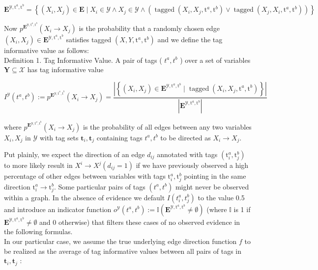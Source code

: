 \documentclass[10pt]{article}
\begin{document}
\begin{equation*}
\mathbf{E}^{\mathcal{Y}, \mathrm{t}^{a}, \mathrm{t}^{b}}=\left\{\left(X_{i}, X_{j}\right) \in \mathbf{E} \mid X_{i} \in \mathcal{Y} \wedge X_{j} \in \mathcal{Y} \wedge\left(\operatorname{tagged}\left(X_{i}, X_{j}, \mathrm{t}^{a}, \mathrm{t}^{b}\right) \vee \operatorname{tagged}\left(X_{j}, X_{i}, \mathrm{t}^{a}, \mathrm{t}^{b}\right)\right)\right\} \tag{1}
\end{equation*}


Now $p^{\mathbf{E}^{\mathcal{Y}, \mathrm{t}^{a}, \mathrm{t}^{b}}}\left(X_{i} \rightarrow X_{j}\right)$ is the probability that a randomly chosen edge $\left(X_{i}, X_{j}\right) \in \mathbf{E}^{\mathcal{Y}, \mathrm{t}^{a}, \mathrm{t}^{b}}$ satisfies tagged $\left(X, Y, \mathrm{t}^{a}, \mathrm{t}^{b}\right)$ and we define the tag informative value as follows:\\
Definition 1. Tag Informative Value. A pair of tags ( $t^{a}, t^{b}$ ) over a set of variables $\boldsymbol{Y} \subseteq \boldsymbol{\mathcal { X }}$ has tag informative value

$$
I^{\mathcal{Y}}\left(t^{a}, t^{b}\right):=p^{\mathbf{E}^{\mathcal{Y}, \mathrm{t}^{a}, \mathrm{t}^{b}}}\left(X_{i} \rightarrow X_{j}\right)=\frac{\left|\left\{\left(X_{i}, X_{j}\right) \in \mathbf{E}^{\mathcal{Y}, \mathrm{t}^{a}, \mathrm{t}^{b}} \mid \operatorname{tagged}\left(X_{i}, X_{j}, \mathrm{t}^{a}, \mathrm{t}^{b}\right)\right\}\right|}{\left|\mathbf{E}^{\mathcal{Y}, \mathrm{t}^{a}, \mathrm{t}^{b}}\right|}
$$

where $p^{\mathbf{E}^{\mathcal{Y}, \mathrm{t}^{a}, \mathrm{t}^{b}}}\left(X_{i} \rightarrow X_{j}\right)$ is the probability of all edges between any two variables $X_{i}, X_{j}$ in $\mathcal{Y}$ with tag sets $\mathbf{t}_{i}, \mathbf{t}_{j}$ containing tags $t^{a}, t^{b}$ to be directed as $X_{i} \rightarrow X_{j}$.

Put plainly, we expect the direction of an edge $d_{i j}$ annotated with tags $\left(\mathrm{t}_{i}^{a}, \mathrm{t}_{j}^{b}\right)$ to more likely result in $X^{i} \rightarrow X^{j}\left(d_{i j}=1\right)$ if we have previously observed a high percentage of other edges between variables with tags $\mathrm{t}_{i}^{a}, \mathrm{t}_{j}^{b}$ pointing in the same direction $\mathrm{t}_{i}^{a} \rightarrow \mathrm{t}_{j}^{b}$. Some particular pairs of tags $\left(t^{a}, t^{b}\right)$ might never be observed within a graph. In the absence of evidence we default $I\left(t_{i}^{a}, t_{j}^{b}\right)$ to the value 0.5 and introduce an indicator function $o^{\mathcal{Y}}\left(t^{a}, t^{b}\right):=\mathbb{I}\left(\mathbf{E}^{\mathcal{Y}, \mathrm{t}^{a}, \mathrm{t}^{b}} \neq \emptyset\right)$ (where $\mathbb{I}$ is 1 if $\mathbf{E}^{\mathcal{Y}, \mathrm{t}^{a}, \mathrm{t}^{b}} \neq \emptyset$ and 0 otherwise) that filters these cases of no observed evidence in the following formulas.\\
In our particular case, we assume the true underlying edge direction function $f$ to be realized as the average of tag informative values between all pairs of tags in $\mathbf{t}_{i}, \mathbf{t}_{j}$ :
\end{document}
